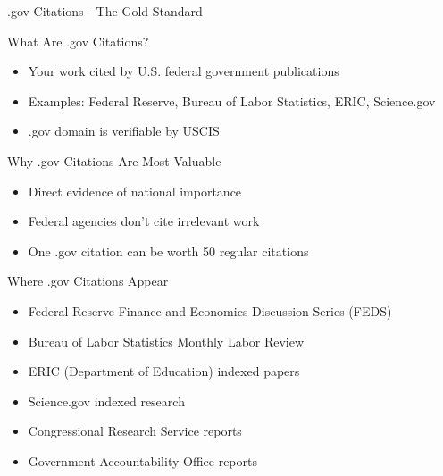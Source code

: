 \documentclass[11pt]{beamer}
\begin{document}
	\begin{frame}{.gov Citations - The Gold Standard}
		\scriptsize
		\begin{block}{What Are .gov Citations?}
			\begin{itemize}
				\item Your work cited by U.S. federal government publications
				\item Examples: Federal Reserve, Bureau of Labor Statistics, ERIC, Science.gov
				\item .gov domain is verifiable by USCIS
			\end{itemize}
		\end{block}
		\begin{block}{Why .gov Citations Are Most Valuable}
			\begin{itemize}
				\item Direct evidence of national importance
				\item Federal agencies don't cite irrelevant work
				\item One .gov citation can be worth 50 regular citations
			\end{itemize}
		\end{block}
		\begin{block}{Where .gov Citations Appear}
			\begin{itemize}
				\item Federal Reserve Finance and Economics Discussion Series (FEDS)
				\item Bureau of Labor Statistics Monthly Labor Review
				\item ERIC (Department of Education) indexed papers
				\item Science.gov indexed research
				\item Congressional Research Service reports
				\item Government Accountability Office reports
			\end{itemize}
		\end{block}
	\end{frame}
	
\end{document}
